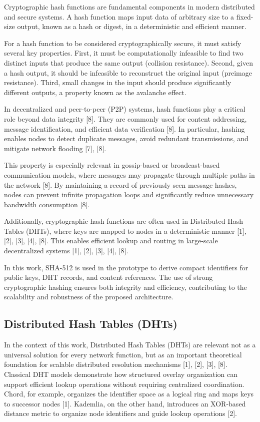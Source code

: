 \documentclass[12pt]{article}
\begin{document}
Cryptographic hash functions are fundamental components in modern distributed and secure systems. A hash function maps input data of arbitrary size to a fixed-size output, known as a hash or digest, in a deterministic and efficient manner.

For a hash function to be considered cryptographically secure, it must satisfy several key properties. First, it must be computationally infeasible to find two distinct inputs that produce the same output (collision resistance). Second, given a hash output, it should be infeasible to reconstruct the original input (preimage resistance). Third, small changes in the input should produce significantly different outputs, a property known as the avalanche effect.

In decentralized and peer-to-peer (P2P) systems, hash functions play a critical role beyond data integrity [8]. They are commonly used for content addressing, message identification, and efficient data verification [8]. In particular, hashing enables nodes to detect duplicate messages, avoid redundant transmissions, and mitigate network flooding [7], [8].

This property is especially relevant in gossip-based or broadcast-based communication models, where messages may propagate through multiple paths in the network [8]. By maintaining a record of previously seen message hashes, nodes can prevent infinite propagation loops and significantly reduce unnecessary bandwidth consumption [8].

Additionally, cryptographic hash functions are often used in Distributed Hash Tables (DHTs), where keys are mapped to nodes in a deterministic manner [1], [2], [3], [4], [8]. This enables efficient lookup and routing in large-scale decentralized systems [1], [2], [3], [4], [8].

In this work, SHA-512 is used in the prototype to derive compact identifiers for public keys, DHT records, and content references. The use of strong cryptographic hashing ensures both integrity and efficiency, contributing to the scalability and robustness of the proposed architecture.

\subsection{Distributed Hash Tables (DHTs)}

In the context of this work, Distributed Hash Tables (DHTs) are relevant not as a
universal solution for every network function, but as an important theoretical
foundation for scalable distributed resolution mechanisms [1], [2], [3], [8].
Classical DHT models demonstrate how structured overlay organization can support
efficient lookup operations without requiring centralized coordination. Chord, for
example, organizes the identifier space as a logical ring and maps keys to successor
nodes [1]. Kademlia, on the other hand, introduces an XOR-based distance metric to
organize node identifiers and guide lookup operations [2].
\end{document}
